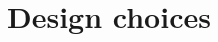 \documentclass[letterpaper, 10 pt, conference]{ieeeconf}  %
\begin{document}



\section{Design choices}
\end{document}
